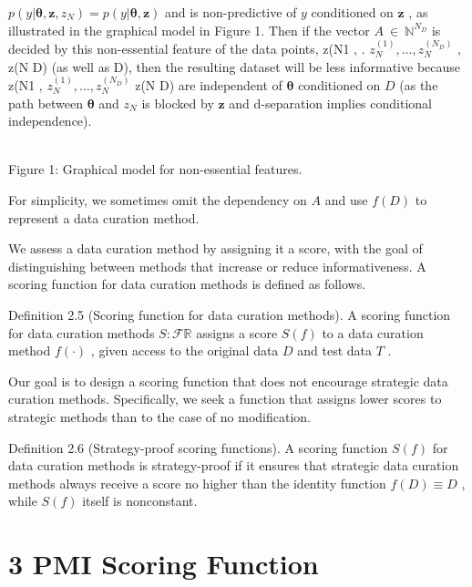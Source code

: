 \(p ( y | \pmb \theta , \mathbf z , z _ { N } ) = p ( y | \pmb \theta , \mathbf z )\)
and is non-predictive of \(y\) conditioned on \(\mathbf { z }\) , as
illustrated in the graphical model in Figure 1. Then if the vector
\(A \ \in \ \mathbb { N } ^ { N _ { D } }\) is decided by this
non-essential feature of the data points, z(N1 , .
\(z _ { N } ^ { ( 1 ) } , \dots , z _ { N } ^ { ( N _ { D } ) }\) , z(N
D) (as well as D), then the resulting dataset will be less informative
because z(N1 ,
\(z _ { N } ^ { ( 1 ) } , \dots , z _ { N } ^ { ( N _ { D } ) }\) z(N D)
are independent of \(\pmb \theta\) conditioned on \(D\) (as the path
between \(\pmb \theta\) and \(z _ { N }\) is blocked by
\(\mathbf { z }\) and d-separation implies conditional independence).

\\
Figure 1: Graphical model for non-essential features.

For simplicity, we sometimes omit the dependency on \(A\) and use
\(f ( D )\) to represent a data curation method.

We assess a data curation method by assigning it a score, with the goal
of distinguishing between methods that increase or reduce
informativeness. A scoring function for data curation methods is defined
as follows.

Definition 2.5 (Scoring function for data curation methods). A scoring
function for data curation methods \(S : \mathcal { F }  \mathbb { R }\)
assigns a score \(S ( f )\) to a data curation method \(f ( \cdot )\) ,
given access to the original data \(D\) and test data \(T\) .

Our goal is to design a scoring function that does not encourage
strategic data curation methods. Specifically, we seek a function that
assigns lower scores to strategic methods than to the case of no
modification.

Definition 2.6 (Strategy-proof scoring functions). A scoring function
\(S ( f )\) for data curation methods is strategy-proof if it ensures
that strategic data curation methods always receive a score no higher
than the identity function \(f ( D ) \equiv D\) , while \(S ( f )\)
itself is nonconstant.

\section{3 PMI Scoring Function}\label{pmi-scoring-function}

